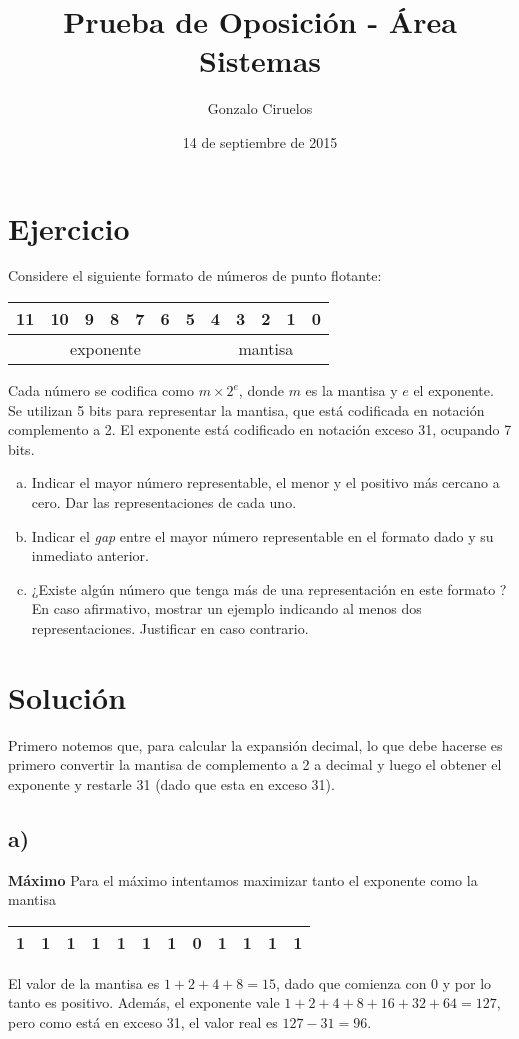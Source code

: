\documentclass[hidelinks,a4paper,10pt, nofootinbib]{article}
\title{Prueba de Oposición - Área Sistemas}
\author{Gonzalo Ciruelos}
\date{14 de septiembre de 2015}
\begin{document}
\maketitle

\section*{Ejercicio}
Considere el siguiente formato de números de punto flotante:
\begin{center}
\begin{tabular}{|c|c|c|c|c|c|c|c|c|c|c|c|}
 11 & 10 & 9 & 8 & 7 & 6 & 5 & 4 & 3 & 2 & 1 & 0 \\ \hline
 \multicolumn{7}{|c|}{exponente} & \multicolumn{5}{c|}{mantisa} \\ \hline
\end{tabular}
\end{center}

Cada número se codifica como $m \times 2^e$, donde $m$ es la mantisa y $e$ el exponente. Se utilizan 5 bits para representar la mantisa, que está codificada en notación complemento a 2. El exponente está codificado en notación exceso 31, ocupando 7 bits.

\begin{enumerate}[a)]
    \item Indicar el mayor número representable, el menor y el positivo más cercano a cero. Dar las representaciones de cada uno.
    \item Indicar el \emph{gap} entre el mayor número representable en el formato dado y su inmediato anterior. 
    \item ¿Existe algún número que tenga más de una representación en este formato ? En caso afirmativo, mostrar un ejemplo indicando al menos dos representaciones. Justificar en caso contrario.
\end{enumerate}

\section*{Solución}
Primero notemos que, para calcular la expansión decimal, lo que debe hacerse es primero convertir la mantisa de complemento a 2 a decimal y luego el obtener el exponente y restarle 31 (dado que esta en exceso 31).

\subsection*{a)}
\textbf{Máximo} Para el máximo intentamos maximizar tanto el exponente como la mantisa
\begin{center}
\begin{tabular}{|c|c|c|c|c|c|c||c|c|c|c|c|}
\hline
1&1&1&1&1&1&1&0&1&1&1&1\\
\hline
\end{tabular}
\end{center}
El valor de la mantisa es $1+2+4+8 = 15$, dado que comienza con $0$ y por lo tanto es positivo.
Además, el exponente vale $1+2+4+8+16+32+64 = 127$, pero como está en exceso 31, el valor real es $127 - 31 = 96$.
\end{document}
